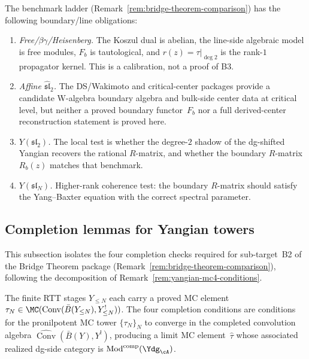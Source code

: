 \begin{remark}
\label{rem:boundary-line-benchmark}
The benchmark ladder
(Remark~\ref{rem:bridge-theorem-comparison}) has the following
boundary/line obligations:
\begin{enumerate}[label=\textup{(\alph*)}]
\item \emph{Free/$\beta\gamma$/Heisenberg.}
 The Koszul dual is abelian, the line-side algebraic model is free
 modules,
 $F_b$ is tautological, and
 $r(z) = \tau|_{\deg 2}$ is the rank-$1$ propagator kernel.
 This is a calibration, not a proof of B3.
\item \emph{Affine $\hat{\mathfrak{sl}}_2$.}
 The DS/Wakimoto and critical-center
 packages provide a candidate W-algebra boundary algebra and
 bulk-side center data at critical level, but neither a proved boundary
 functor~$F_b$ nor a full derived-center reconstruction statement is
 proved here.
\item \emph{$Y(\mathfrak{sl}_2)$.}
 The local test is whether the
 degree-$2$ shadow of the dg-shifted Yangian recovers the rational
 $R$-matrix, and whether the boundary $R$-matrix $R_b(z)$
 matches that benchmark.
\item \emph{$Y(\mathfrak{sl}_N)$.}
 Higher-rank coherence test: the boundary $R$-matrix should satisfy
 the Yang--Baxter equation with the correct spectral parameter.
\end{enumerate}
\end{remark}

\subsection{Completion lemmas for Yangian towers}
\label{subsec:completion-lemmas}

This subsection isolates the four completion checks required for
sub-target~B2 of the Bridge Theorem package
(Remark~\ref{rem:bridge-theorem-comparison}), following the
decomposition of Remark~\ref{rem:yangian-mc4-conditions}.

The finite RTT stages $Y_{\le N}$ each carry a proved MC element
$\tau_N \in \MC(\operatorname{Conv}(\bar B(Y_{\le N}), Y_{\le N}^!))$.
The four completion conditions are conditions for the pronilpotent
MC tower $\{\tau_N\}_N$ to converge in the completed convolution
algebra $\widehat{\operatorname{Conv}}(\bar B(Y), Y^!)$, producing a limit
MC element~$\widehat\tau$ whose associated realized dg-side category is
$\operatorname{Mod}^{\mathrm{comp}}(\Ydg_\cA)$.

